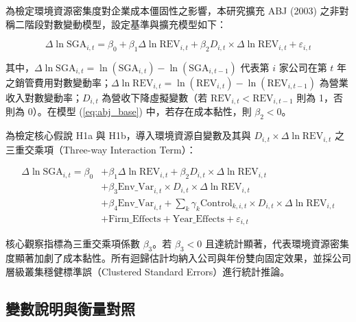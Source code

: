 \documentclass[12pt,a4paper]{article}
\begin{document}
為檢定環境資源密集度對企業成本僵固性之影響，本研究擴充 ABJ (2003) 之非對稱二階段對數變動模型，設定基準與擴充模型如下：

\begin{equation}
\label{eq:abj_base}
\Delta\ln\text{SGA}_{i,t} = \beta_0 + \beta_1 \Delta\ln\text{REV}_{i,t} + \beta_2 D_{i,t} \times \Delta\ln\text{REV}_{i,t} + \varepsilon_{i,t}
\end{equation}

其中，$\Delta\ln\text{SGA}_{i,t} = \ln(\text{SGA}_{i,t}) - \ln(\text{SGA}_{i,t-1})$ 代表第 $i$ 家公司在第 $t$ 年之銷管費用對數變動率；$\Delta\ln\text{REV}_{i,t} = \ln(\text{REV}_{i,t}) - \ln(\text{REV}_{i,t-1})$ 為營業收入對數變動率；$D_{i,t}$ 為營收下降虛擬變數（若 $\text{REV}_{i,t} < \text{REV}_{i,t-1}$ 則為 1，否則為 0）。在模型 (\ref{eq:abj_base}) 中，若存在成本黏性，則 $\beta_2 < 0$。

為檢定核心假說 H1a 與 H1b，導入環境資源自變數及其與 $D_{i,t} \times \Delta\ln\text{REV}_{i,t}$ 之三重交乘項（Three-way Interaction Term）：

\begin{equation}
\label{eq:env_model}
\begin{aligned}
\Delta\ln\text{SGA}_{i,t} = \beta_0 &+ \beta_1 \Delta\ln\text{REV}_{i,t} + \beta_2 D_{i,t} \times \Delta\ln\text{REV}_{i,t} \\
&+ \beta_3 \text{Env\_Var}_{i,t} \times D_{i,t} \times \Delta\ln\text{REV}_{i,t} \\
&+ \beta_4 \text{Env\_Var}_{i,t} + \sum_k \gamma_k \text{Control}_{k,i,t} \times D_{i,t} \times \Delta\ln\text{REV}_{i,t} \\
&+ \text{Firm\_Effects} + \text{Year\_Effects} + \varepsilon_{i,t}
\end{aligned}
\end{equation}

核心觀察指標為三重交乘項係數 $\beta_3$。若 $\beta_3 < 0$ 且達統計顯著，代表環境資源密集度顯著加劇了成本黏性。所有迴歸估計均納入公司與年份雙向固定效果，並採公司層級叢集穩健標準誤（Clustered Standard Errors）進行統計推論。

\subsection{變數說明與衡量對照}
\end{document}
